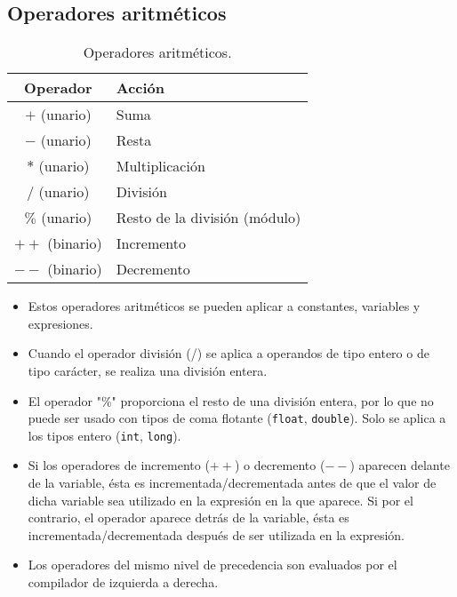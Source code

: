 \subsection{Operadores aritméticos}{
\begin{center}
	\begin{table}[htbp]
		\begin{center}
			\begin{tabular}{|c|l|}
				\hline
				\textbf{Operador} & \textbf{Acción}  \\
				\hline 
				$+$ (unario) & Suma\\ \hline
				$-$ (unario) & Resta\\ \hline
				$*$ (unario) & Multiplicación\\ \hline
				$/$ (unario) & División\\ \hline
				$\%$ (unario) & Resto de la división (módulo)\\ \hline
				$++$ (binario) & Incremento\\ \hline
				$--$ (binario) & Decremento\\ \hline	
			\end{tabular}
			\caption{Operadores aritméticos.}
			\label{tabla:Operadores aritméticos}
		\end{center}
	\end{table}
\end{center}

\begin{itemize}
	\item Estos operadores aritméticos se pueden aplicar a constantes, variables y expresiones.
	\item Cuando el operador división (/) se aplica a operandos de tipo entero o de tipo carácter, se realiza una división entera.
	\item El operador "\%" proporciona el resto de una división entera, por lo que no puede ser usado con tipos de coma flotante (\texttt{float}, \texttt{double}). Solo se aplica a los tipos entero (\texttt{int}, \texttt{long}).
	\item Si los operadores de incremento ($++$) o decremento ($--$) aparecen delante de la variable, ésta es incrementada/decrementada antes de que el valor de dicha variable sea utilizado en la expresión en la que aparece. Si por el contrario, el operador aparece detrás de la variable, ésta es incrementada/decrementada después de ser utilizada en la expresión.
	\item Los operadores del mismo nivel de precedencia son evaluados por el compilador de izquierda a derecha.
\end{itemize}
}
